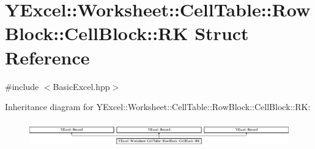 \hypertarget{struct_y_excel_1_1_worksheet_1_1_cell_table_1_1_row_block_1_1_cell_block_1_1_r_k}{}\section{Y\+Excel\+:\+:Worksheet\+:\+:Cell\+Table\+:\+:Row\+Block\+:\+:Cell\+Block\+:\+:R\+K Struct Reference}
\label{struct_y_excel_1_1_worksheet_1_1_cell_table_1_1_row_block_1_1_cell_block_1_1_r_k}


{\ttfamily \#include $<$Basic\+Excel.\+hpp$>$}

Inheritance diagram for Y\+Excel\+:\+:Worksheet\+:\+:Cell\+Table\+:\+:Row\+Block\+:\+:Cell\+Block\+:\+:R\+K\+:\begin{figure}[H]
\begin{center}
\leavevmode
\includegraphics[height=1.145194cm]{struct_y_excel_1_1_worksheet_1_1_cell_table_1_1_row_block_1_1_cell_block_1_1_r_k}
\end{center}
\end{figure}
